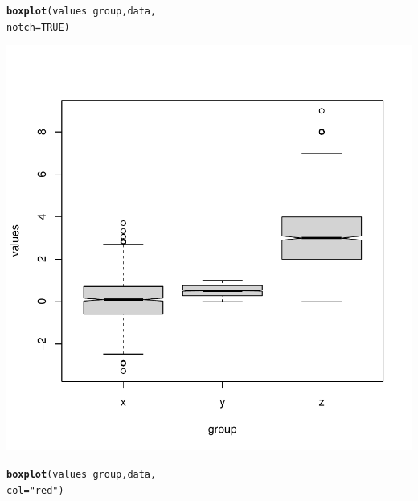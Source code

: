 \documentclass{article}\usepackage[]{graphicx}\usepackage[]{xcolor}
\makeatletter
\def\maxwidth{ %
  \ifdim\Gin@nat@width>\linewidth
    \linewidth
  \else
    \Gin@nat@width
  \fi
}
\newcommand{\hlnum}[1]{\textcolor[rgb]{0.686,0.059,0.569}{#1}}%
\newcommand{\hlstr}[1]{\textcolor[rgb]{0.192,0.494,0.8}{#1}}%
\newcommand{\hlopt}[1]{\textcolor[rgb]{0,0,0}{#1}}%
\newcommand{\hlstd}[1]{\textcolor[rgb]{0.345,0.345,0.345}{#1}}%
\newcommand{\hlkwc}[1]{\textcolor[rgb]{0.333,0.667,0.333}{#1}}%
\newcommand{\hlkwd}[1]{\textcolor[rgb]{0.737,0.353,0.396}{\textbf{#1}}}%
\newenvironment{kframe}{%
 \def\at@end@of@kframe{}%
 \ifinner\ifhmode%
  \def\at@end@of@kframe{\end{minipage}}%
  \begin{minipage}{\columnwidth}%
 \fi\fi%
 \def\FrameCommand##1{\hskip\@totalleftmargin \hskip-\fboxsep
 \colorbox{shadecolor}{##1}\hskip-\fboxsep
     \hskip-\linewidth \hskip-\@totalleftmargin \hskip\columnwidth}%
 \MakeFramed {\advance\hsize-\width
   \@totalleftmargin\z@ \linewidth\hsize
   \@setminipage}}%
 {\par\unskip\endMakeFramed%
 \at@end@of@kframe}
\newenvironment{knitrout}{}{} %
\makeatother
\begin{document}
\begin{knitrout}
{}


\begin{kframe}\begin{alltt}
\hlkwd{boxplot}\hlstd{(values} \hlopt{~} \hlstd{group, data,}
        \hlkwc{notch} \hlstd{=} \hlnum{TRUE}\hlstd{)}
\end{alltt}
\end{kframe}

{\centering \includegraphics[width=\maxwidth]{figure/unnamed-chunk-1-5} 

}


\begin{kframe}\begin{alltt}
\hlkwd{boxplot}\hlstd{(values} \hlopt{~} \hlstd{group, data,}
        \hlkwc{col} \hlstd{=} \hlstr{"red"}\hlstd{)}
\end{alltt}
\end{kframe}


\end{knitrout}
\end{document}

